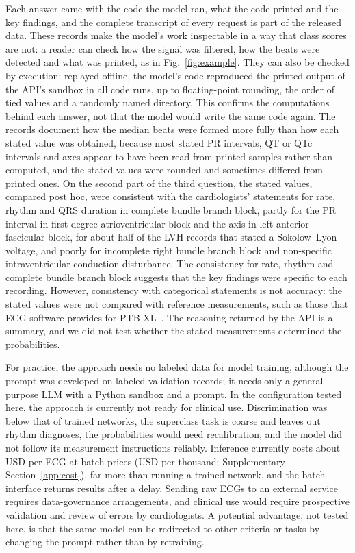 Each answer came with the code the model ran, what the code printed and the key findings, and the complete transcript of
every request is part of the released data. These records make the model's work inspectable in a way that class
scores are not: a reader can check how the signal was filtered, how the beats were detected and what was printed, as in
Fig.~\ref{fig:example}. They can also be checked by execution: replayed offline, the model's code reproduced the
printed output of the API's sandbox in all \RPRuns{} code runs, up to floating-point rounding, the order of tied
values and a randomly named directory. This confirms the computations behind each answer, not that the model would write the same code again. The
records document how the median beats were formed more fully than how each stated value was
obtained, because most stated PR intervals, QT or QTc intervals and axes appear to have been read from printed samples
rather than computed, and the stated values were rounded and sometimes differed from printed ones. On the second part of the third question, the stated values, compared post hoc,
were consistent with the cardiologists' statements for rate, rhythm and QRS duration in
complete bundle branch block, partly for the PR interval in first-degree atrioventricular block and the axis in left
anterior fascicular block, for about half of the LVH records that stated a Sokolow--Lyon voltage, and poorly for
incomplete right bundle branch block and non-specific intraventricular conduction disturbance. The consistency for rate,
rhythm and complete bundle branch block suggests that the key findings were specific to each recording. However,
consistency with categorical statements is not accuracy: the stated values were not compared with reference
measurements, such as those that ECG software provides for PTB-XL~\citep{Strodthoff2023ptbxlplus}. The reasoning
returned by the API is a summary, and we did not test whether the stated measurements determined the probabilities.

For practice, the approach needs no labeled data for model training, although the prompt was developed on
\NDevRecordsUsed{} labeled validation records; it needs only a general-purpose LLM with a Python sandbox and a prompt.
In the configuration tested here, the approach is currently not ready for clinical use. Discrimination was below that of trained networks, the superclass task is coarse and
leaves out rhythm diagnoses, the probabilities would need recalibration, and the model did not follow its measurement
instructions reliably. Inference currently costs about USD \CostPerRecord{} per ECG at batch prices (USD \CostPerThousand{}
per thousand; Supplementary Section~\ref{app:cost}), far more than running a trained network, and the batch interface returns results after a delay. Sending raw
ECGs to an external service requires data-governance arrangements, and clinical use would require prospective
validation and review of errors by cardiologists. A potential advantage, not tested here, is that the same model can be
redirected to other criteria or tasks by changing the prompt rather than by retraining.

